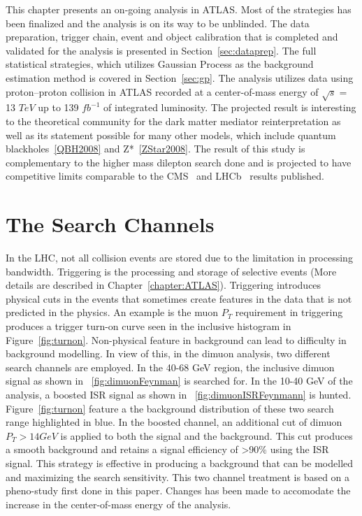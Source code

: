 This chapter presents an on-going analysis in ATLAS. Most of the strategies has been finalized and the analysis is on its way to be unblinded. The data preparation, trigger chain, event and object calibration that is completed and validated for the analysis is presented in Section~\ref{sec:dataprep}. The full statistical strategies, which utilizes Gaussian Process as the background estimation method is covered in Section~\ref{sec:gp}. The analysis utilizes data using proton--proton collision in ATLAS
recorded at a center-of-mass energy of $\sqrt{s}=$ 13 $TeV$ up to 139 $fb^{-1}$ of integrated luminosity. The projected result is interesting to the theoretical community for the dark matter mediator reinterpretation as well as its statement possible for many other models, which include quantum blackholes~\ref{QBH2008} and Z*~\ref{ZStar2008}. The result of this study is complementary to the higher mass dilepton search done and is projected to have competitive limits comparable to the CMS~\cite{CMS-PAS-EXO-19-018} and LHCb~\cite{Aaij:2722971} results published.

\section{The Search Channels}
In the LHC, not all collision events are stored due to the limitation in processing bandwidth. Triggering is the processing and storage of selective events (More details are described in Chapter~\ref{chapter:ATLAS}). Triggering introduces physical cuts in the events that sometimes create features in the data that is not predicted in the physics. An example is the muon $P_{T}$ requirement in triggering produces a trigger turn-on curve seen in the inclusive histogram in Figure~\ref{fig:turnon}.
Non-physical feature in background can lead to difficulty in background modelling. In view of this, in the dimuon analysis, two different search channels are employed. In the 40-68 GeV region, the inclusive dimuon signal as shown in ~\ref{fig:dimuonFeynman} is searched for. In the 10-40 GeV of the analysis, a boosted ISR signal as shown in ~\ref{fig:dimuonISRFeynmann} is hunted. Figure~\ref{fig:turnon} feature a the background distribution of these two search range highlighted in blue. In the
boosted channel, an additional cut of dimuon $P_{T}>14 GeV$ is applied to both the signal and the background. This cut produces a smooth background and retains a signal efficiency of >90\% using the ISR signal. This strategy is effective in producing a background that can be modelled and maximizing the search sensitivity. 
This two channel treatment is based on a pheno-study first done in this paper\cite{2014}. Changes has been made to accomodate the increase in the center-of-mass energy of the analysis. 

